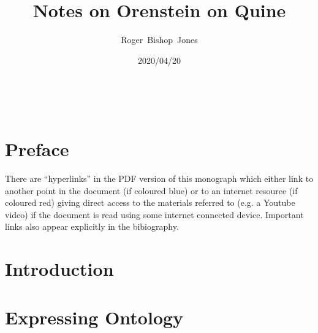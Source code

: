 \documentclass[10pt,titlepage]{article}
\title{\LARGE\bf Notes on Orenstein on Quine}
\author{Roger~Bishop~Jones}
\date{\small 2020/04/20}
\newcommand{\ignore}[1]{}
\begin{document}
% 
                               
\begin{titlepage}
\maketitle





\end{titlepage}

\ \

\ignore{
\begin{centering}
{}
\end{centering}
}%

\setcounter{tocdepth}{2}
{\parskip-0pt\tableofcontents}


\pagebreak

\section*{Preface}


There are ``hyperlinks'' in the PDF version of this monograph which either link to another point in the document  (if coloured blue) or to an internet resource  (if coloured red) giving direct access to the materials referred to (e.g. a Youtube video) if the document is read using some internet connected device.
Important links also appear explicitly in the bibiography.

\section{Introduction}

\section{Expressing Ontology}
\end{document}
